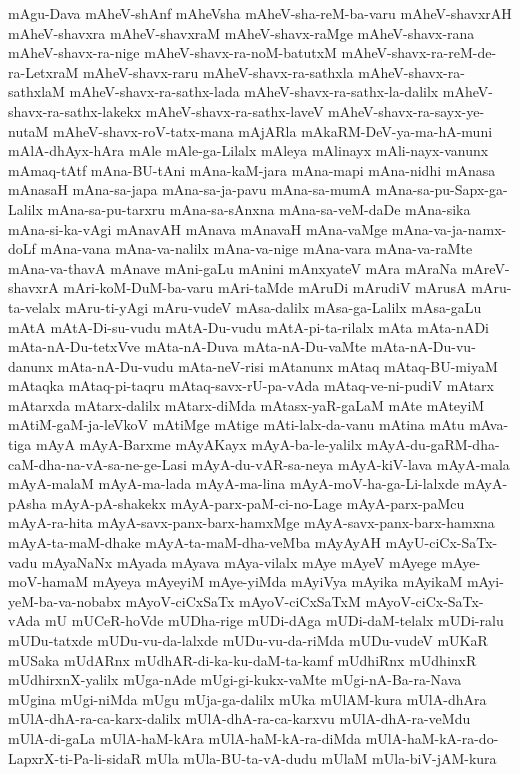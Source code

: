 {mAgu-Dava
mAheV-shAnf
mAheVsha
mAheV-sha-reM-ba-varu
mAheV-shavxrAH
mAheV-shavxra
mAheV-shavxraM
mAheV-shavx-raMge
mAheV-shavx-rana
mAheV-shavx-ra-nige
mAheV-shavx-ra-noM-batutxM
mAheV-shavx-ra-reM-de-ra-LetxraM
mAheV-shavx-raru
mAheV-shavx-ra-sathxla
mAheV-shavx-ra-sathxlaM
mAheV-shavx-ra-sathx-lada
mAheV-shavx-ra-sathx-la-dalilx
mAheV-shavx-ra-sathx-lakekx
mAheV-shavx-ra-sathx-laveV
mAheV-shavx-ra-sayx-ye-nutaM
mAheV-shavx-roV-tatx-mana
mAjARla
mAkaRM-DeV-ya-ma-hA-muni
mAlA-dhAyx-hAra
mAle
mAle-ga-Lilalx
mAleya
mAlinayx
mAli-nayx-vanunx
mAmaq-tAtf
mAna-BU-tAni
mAna-kaM-jara
mAna-mapi
mAna-nidhi
mAnasa
mAnasaH
mAna-sa-japa
mAna-sa-ja-pavu
mAna-sa-mumA
mAna-sa-pu-Sapx-ga-Lalilx
mAna-sa-pu-tarxru
mAna-sa-sAnxna
mAna-sa-veM-daDe
mAna-sika
mAna-si-ka-vAgi
mAnavAH
mAnava
mAnavaH
mAna-vaMge
mAna-va-ja-namx-doLf
mAna-vana
mAna-va-nalilx
mAna-va-nige
mAna-vara
mAna-va-raMte
mAna-va-thavA
mAnave
mAni-gaLu
mAnini
mAnxyateV
mAra
mAraNa
mAreV-shavxrA
mAri-koM-DuM-ba-varu
mAri-taMde
mAruDi
mArudiV
mArusA
mAru-ta-velalx
mAru-ti-yAgi
mAru-vudeV
mAsa-dalilx
mAsa-ga-Lalilx
mAsa-gaLu
mAtA
mAtA-Di-su-vudu
mAtA-Du-vudu
mAtA-pi-ta-rilalx
mAta
mAta-nADi
mAta-nA-Du-tetxVve
mAta-nA-Duva
mAta-nA-Du-vaMte
mAta-nA-Du-vu-danunx
mAta-nA-Du-vudu
mAta-neV-risi
mAtanunx
mAtaq
mAtaq-BU-miyaM
mAtaqka
mAtaq-pi-taqru
mAtaq-savx-rU-pa-vAda
mAtaq-ve-ni-pudiV
mAtarx
mAtarxda
mAtarx-dalilx
mAtarx-diMda
mAtasx-yaR-gaLaM
mAte
mAteyiM
mAtiM-gaM-ja-leVkoV
mAtiMge
mAtige
mAti-lalx-da-vanu
mAtina
mAtu
mAva-tiga
mAyA
mAyA-Barxme
mAyAKayx
mAyA-ba-le-yalilx
mAyA-du-gaRM-dha-caM-dha-na-vA-sa-ne-ge-Lasi
mAyA-du-vAR-sa-neya
mAyA-kiV-lava
mAyA-mala
mAyA-malaM
mAyA-ma-lada
mAyA-ma-lina
mAyA-moV-ha-ga-Li-lalxde
mAyA-pAsha
mAyA-pA-shakekx
mAyA-parx-paM-ci-no-Lage
mAyA-parx-paMcu
mAyA-ra-hita
mAyA-savx-panx-barx-hamxMge
mAyA-savx-panx-barx-hamxna
mAyA-ta-maM-dhake
mAyA-ta-maM-dha-veMba
mAyAyAH
mAyU-ciCx-SaTx-vadu
mAyaNaNx
mAyada
mAyava
mAya-vilalx
mAye
mAyeV
mAyege
mAye-moV-hamaM
mAyeya
mAyeyiM
mAye-yiMda
mAyiVya
mAyika
mAyikaM
mAyi-yeM-ba-va-nobabx
mAyoV-ciCxSaTx
mAyoV-ciCxSaTxM
mAyoV-ciCx-SaTx-vAda
mU
mUCeR-hoVde
mUDha-rige
mUDi-dAga
mUDi-daM-telalx
mUDi-ralu
mUDu-tatxde
mUDu-vu-da-lalxde
mUDu-vu-da-riMda
mUDu-vudeV
mUKaR
mUSaka
mUdARnx
mUdhAR-di-ka-ku-daM-ta-kamf
mUdhiRnx
mUdhinxR
mUdhirxnX-yalilx
mUga-nAde
mUgi-gi-kukx-vaMte
mUgi-nA-Ba-ra-Nava
mUgina
mUgi-niMda
mUgu
mUja-ga-dalilx
mUka
mUlAM-kura
mUlA-dhAra
mUlA-dhA-ra-ca-karx-dalilx
mUlA-dhA-ra-ca-karxvu
mUlA-dhA-ra-veMdu
mUlA-di-gaLa
mUlA-haM-kAra
mUlA-haM-kA-ra-diMda
mUlA-haM-kA-ra-do-LapxrX-ti-Pa-li-sidaR
mUla
mUla-BU-ta-vA-dudu
mUlaM
mUla-biV-jAM-kura
}
